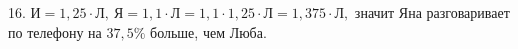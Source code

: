 16. $\text{И}=1,25\cdot\text{Л},\ \text{Я}=1,1\cdot\text{Л}=1,1\cdot1,25\cdot\text{Л}=1,375\cdot\text{Л},$ значит Яна разговаривает по телефону на $37,5\%$ больше, чем Люба.\\
